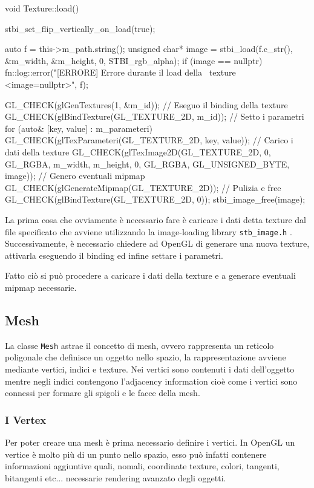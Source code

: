 \begin{cpp}[caption={Funzione utilizzata per il caricamento, generazione e creazione delle texture in OpenGL.}, captionpos=t]
void Texture::load(){
	stbi_set_flip_vertically_on_load(true);
	
	auto f = this->m_path.string();
	unsigned char* image = stbi_load(f.c_str(), &m_width, 
                                     &m_height, 0, STBI_rgb_alpha);
	if (image == nullptr)
		fn::log::error("[ERRORE] Errore durante il load della \
		                texture {} <image=nullptr>\n", f);
	
	GL_CHECK(glGenTextures(1, &m_id));
	// Eseguo il binding della texture
	GL_CHECK(glBindTexture(GL_TEXTURE_2D, m_id));
	// Setto i parametri 
	for (auto& [key, value] : m_parameteri) {
		GL_CHECK(glTexParameteri(GL_TEXTURE_2D, key, value));
	}
	// Carico i dati della texture
	GL_CHECK(glTexImage2D(GL_TEXTURE_2D, 0, GL_RGBA, m_width,
	                      m_height, 0, GL_RGBA, 
                          GL_UNSIGNED_BYTE, image));
	// Genero eventuali mipmap
	GL_CHECK(glGenerateMipmap(GL_TEXTURE_2D));
	// Pulizia e free
	GL_CHECK(glBindTexture(GL_TEXTURE_2D, 0));
	stbi_image_free(image);
}
\end{cpp}

La prima cosa che ovviamente è necessario fare è caricare i dati detta texture dal file specificato che avviene utilizzando la image-loading library \texttt{stb\_image.h} \cite{STB}. Successivamente, è necessario chiedere ad OpenGL di generare una nuova texture, attivarla eseguendo il binding ed infine settare i parametri. 

Fatto ciò si può procedere a caricare i dati della texture e a generare eventuali mipmap necessarie.

\subsection{Mesh}
La classe \texttt{Mesh} astrae il concetto di mesh, ovvero rappresenta un reticolo poligonale che definisce un oggetto nello spazio, la rappresentazione avviene mediante vertici, indici e texture. Nei vertici sono contenuti i dati dell'oggetto mentre negli indici contengono l'adjacency information cioè come i vertici sono connessi per formare gli spigoli e le facce della mesh.

\subsubsection{I Vertex}
Per poter creare una mesh è prima necessario definire i vertici. In OpenGL un vertice è molto più di un punto nello spazio, esso può infatti contenere informazioni aggiuntive quali, nomali, coordinate texture, colori, tangenti, bitangenti etc... necessarie rendering avanzato degli oggetti. 

